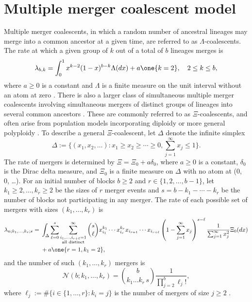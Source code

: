 \documentclass{article}
\begin{document}
\label{app-multiple-mergers}
\section*{Multiple merger coalescent model}

Multiple merger coalescents, in which a random number of ancestral
lineages may merge into a common ancestor at a given time,
are referred to as $\Lambda$-coalescents.
The rate at which  a given group of $k$ out of a total of  $b$ lineages merges  is
\begin{equation}\label{lambdabk}
\lambda_{b, k} =  \int_0^1  x^{k-2}(1-x)^{b-k}\Lambda(dx) + a\one{k=2}, \quad 2 \le k \le b,
\end{equation}
where $a \geq 0$ is a constant and $\Lambda$ is a finite measure on the unit interval without an atom at zero \citep{DK99,P99,S99}.
There is also a larger class of simultaneous multiple merger coalescents involving
simultaneous mergers of distinct groups of lineages into several common ancestors \citep{S00}.
These are commonly referred to as $\Xi$-coalescents, and
often arise from population models incorporating diploidy or more general polyploidy
\citep{BBE13,blath2016site}.
To describe a general $\Xi$-coalescent, let $\Delta$ denote the
infinite simplex
\begin{equation*}
 \Delta := \Bigg\{ (x_1,x_2,  \ldots ): x_1 \ge x_2 \ge \cdots \ge 0, \sum_{j = 1}^{ \infty} x_j \le 1\Bigg\}.
 \end{equation*}
The rate of mergers is determined by
$\Xi = \Xi_0 + a\delta_0$, where $a \geq 0$ is a constant, $\delta_0$ is the Dirac delta
measure, and $\Xi_0$ is a finite measure on $\Delta$ with no atom at (0, 0, \ldots).
For an initial number of blocks $b \geq 2$ and
$r \in \{1,2, \ldots, b - 1 \}$, let $k_1 \geq 2, \ldots, k_r \ge 2$ be the sizes of $r$ merger events
and $s = b - k_1 - \cdots - k_r$ be the number of blocks not participating in any merger.
The rate of each possible set of mergers with sizes $(k_1, \ldots, k_r)$ is
\begin{align*}
  \lambda_{n; k_1, \ldots, k_r; s}  = {}& \int_\Delta  \sum_{\ell = 0}^s \sum_{\substack {i_1, \ldots, i_{r+\ell} = 1\\ \text{all distinct}} }^\infty  \binom{s}{\ell} x_{i_1}^{k_1} \cdots  x
_{i_{r}}^{k_r} x_{i_{r+1}} \cdots x_{i_{r+\ell}}\left(1 - \sum_{j=1}^\infty x_j \right)^{s-\ell} \frac{1}{ \sum_{j=1}^\infty x_j^2 } \Xi_0(dx)   \\
  & +  a\one{r=1, k_1 = 2},
\end{align*}
and the number of such $(k_1, \ldots, k_r)$ mergers is
\begin{equation*}
    \mathcal{N}(b; k_1, \ldots, k_r ) = \binom{b}{k_1 \ldots k_r\, s} \frac{1}{ \prod_{j=2}^b\ell_j!  },
\end{equation*}
where $\ell_j := \#\{ i \in \{ 1, \ldots, r \} : k_i = j \}$ is the number of mergers of size $j \geq 2$ \citep{S00}.
\end{document}
